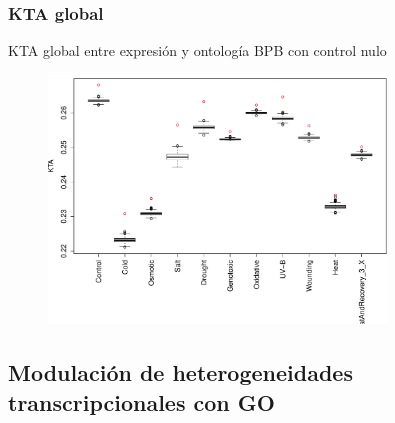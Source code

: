 \documentclass[serif,9pt, t]{beamer}
\begin{document}
\begin{frame}\frametitle{KTA global} 
\centering
KTA global entre expresión y ontología BPB con control nulo
\begin{figure}
    	\centering
	\includegraphics[width=0.8\textwidth]{kta_global_bpb.pdf}
\end{figure}
\centering
\end{frame}

\subsection{Modulación de heterogeneidades
transcripcionales con GO}
\end{document}
